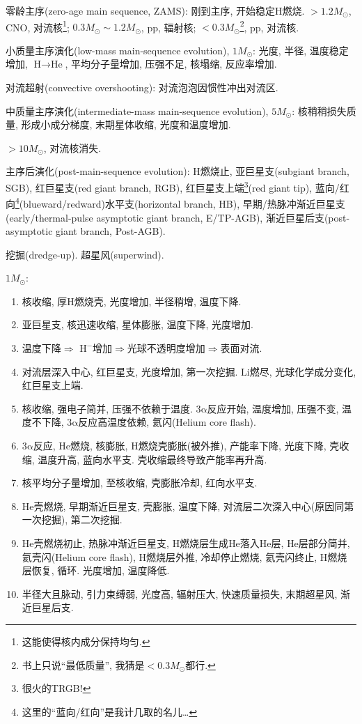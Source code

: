 零龄主序(zero-age main sequence, ZAMS): 刚到主序, 开始稳定$\text{H}$燃烧. $>1.2M_\odot$, CNO, 对流核\footnote{这能使得核内成分保持均匀.}; $0.3M_\odot\sim1.2M_\odot$, pp, 辐射核; $<0.3M_\odot$\footnote{书上只说``最低质量'', 我猜是$<0.3M_\odot$都行.}, pp, 对流核.

小质量主序演化(low-mass main-sequence evolution), $1M_\odot$: 光度, 半径, 温度稳定增加, $\text{H}\to\text{He}$, 平均分子量增加, 压强不足, 核塌缩, 反应率增加.

对流超射(convective overshooting): 对流泡泡因惯性冲出对流区.

中质量主序演化(intermediate-mass main-sequence evolution), $5M_\odot$: 核稍稍损失质量, 形成小成分梯度, 末期星体收缩, 光度和温度增加.

$>10M_\odot$, 对流核消失.

主序后演化(post-main-sequence evolution): $\text{H}$燃烧止, 亚巨星支(subgiant branch, SGB), 红巨星支(red giant branch, RGB), 红巨星支上端\footnote{很火的TRGB!}(red giant tip), 蓝向/红向\footnote{这里的``蓝向/红向''是我计几取的名儿\dots}(blueward/redward)水平支(horizontal branch, HB), 早期/热脉冲渐近巨星支(early/thermal-pulse asymptotic giant branch, E/TP-AGB), 渐近巨星后支(post-asymptotic giant branch, Post-AGB).

挖掘(dredge-up). 超星风(superwind).

$1M_\odot$:
\begin{enumerate}
    \item 核收缩, 厚$\text{H}$燃烧壳, 光度增加, 半径稍增, 温度下降.
    \item 亚巨星支, 核迅速收缩, 星体膨胀, 温度下降, 光度增加.
    \item 温度下降$\Longrightarrow$ $\text{H}^-$增加$\Longrightarrow$光球不透明度增加$\Longrightarrow$表面对流.
    \item 对流层深入中心, 红巨星支, 光度增加, 第一次挖掘. $\text{Li}$燃尽, 光球化学成分变化, 红巨星支上端.
    \item 核收缩, 强电子简并, 压强不依赖于温度. 3$\mathrm{\alpha}$反应开始, 温度增加, 压强不变, 温度不下降,  3$\mathrm{\alpha}$反应高温度依赖, 氦闪(Helium core flash).
    \item 3$\mathrm{\alpha}$反应, $\text{He}$燃烧, 核膨胀, $\text{H}$燃烧壳膨胀(被外推), 产能率下降, 光度下降, 壳收缩, 温度升高, 蓝向水平支. 壳收缩最终导致产能率再升高.
    \item 核平均分子量增加, 至核收缩, 壳膨胀冷却, 红向水平支.
    \item $\text{He}$壳燃烧, 早期渐近巨星支, 壳膨胀, 温度下降, 对流层二次深入中心(原因同第一次挖掘), 第二次挖掘.
    \item $\text{He}$壳燃烧初止, 热脉冲渐近巨星支, $\text{H}$燃烧层生成$\text{He}$落入$\text{He}$层, $\text{He}$层部分简并, 氦壳闪(Helium core flash), $\text{H}$燃烧层外推, 冷却停止燃烧, 氦壳闪终止, $\text{H}$燃烧层恢复, 循环. 光度增加, 温度降低.
    \item 半径大且脉动, 引力束缚弱, 光度高, 辐射压大, 快速质量损失, 末期超星风, 渐近巨星后支.
\end{enumerate}

